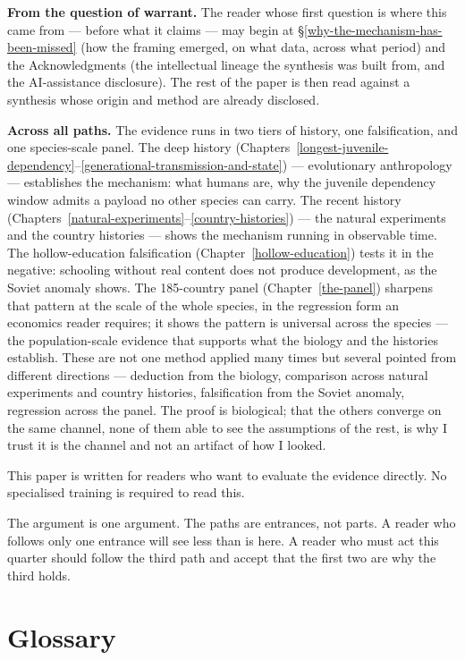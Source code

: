 \documentclass[12pt,letterpaper]{article}
\begin{document}
\textbf{From the question of warrant.} The reader whose first question
is where this came from --- before what it claims --- may begin at
\S\ref{why-the-mechanism-has-been-missed} (how the framing emerged, on
what data, across what period) and the Acknowledgments (the
intellectual lineage the synthesis was built from, and the
AI-assistance disclosure). The rest of the paper is then read against
a synthesis whose origin and method are already disclosed.

\textbf{Across all paths.} The evidence runs in two tiers of history, one falsification, and one species-scale panel. The deep history (Chapters~\ref{longest-juvenile-dependency}--\ref{generational-transmission-and-state}) --- evolutionary anthropology --- establishes the mechanism: what humans are, why the juvenile dependency window admits a payload no other species can carry. The recent history (Chapters~\ref{natural-experiments}--\ref{country-histories}) --- the natural experiments and the country histories --- shows the mechanism running in observable time. The hollow-education falsification (Chapter~\ref{hollow-education}) tests it in the negative: schooling without real content does not produce development, as the Soviet anomaly shows. The 185-country panel (Chapter~\ref{the-panel}) sharpens that pattern at the scale of the whole species, in the regression form an economics reader requires; it shows the pattern is universal across the species --- the population-scale evidence that supports what the biology and the histories establish. These are not one method applied many times but several pointed from different directions --- deduction from the biology, comparison across natural experiments and country histories, falsification from the Soviet anomaly, regression across the panel. The proof is biological; that the others converge on the same channel, none of them able to see the assumptions of the rest, is why I trust it is the channel and not an artifact of how I looked.

This paper is written for readers who want to evaluate the evidence directly. No specialised training is required to read this.

The argument is one argument. The paths are entrances, not parts. A
reader who follows only one entrance will see less than is here. A
reader who must act this quarter should follow the third path and
accept that the first two are why the third holds.

\newpage

\section*{Glossary}\label{glossary}
\end{document}
